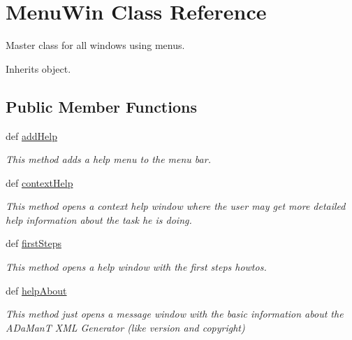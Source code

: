 \hypertarget{classgui_1_1window3_1_1MenuWin}{\section{Menu\-Win Class Reference}
\label{classgui_1_1window3_1_1MenuWin}
}


Master class for all windows using menus.  




Inherits object.

\subsection*{Public Member Functions}
\begin{DoxyCompactItemize}
\item 
def \hyperlink{classgui_1_1window3_1_1MenuWin_ab66f1da42371ac6f08a9817adf59a38e}{add\-Help}
\begin{DoxyCompactList}\small\item\em This method adds a help menu to the menu bar. \end{DoxyCompactList}\item 
def \hyperlink{classgui_1_1window3_1_1MenuWin_a4b810e6adc7d147eaa8edb45dd5891ca}{context\-Help}
\begin{DoxyCompactList}\small\item\em This method opens a context help window where the user may get more detailed help information about the task he is doing. \end{DoxyCompactList}\item 
def \hyperlink{classgui_1_1window3_1_1MenuWin_a2e91f76cce6e9b7a03830202f45aecf0}{first\-Steps}
\begin{DoxyCompactList}\small\item\em This method opens a help window with the first steps howtos. \end{DoxyCompactList}\item 
\hypertarget{classgui_1_1window3_1_1MenuWin_ad4f4bbba4c4a628d0a35195b093d6049}{def \hyperlink{classgui_1_1window3_1_1MenuWin_ad4f4bbba4c4a628d0a35195b093d6049}{help\-About}}\label{classgui_1_1window3_1_1MenuWin_ad4f4bbba4c4a628d0a35195b093d6049}

\begin{DoxyCompactList}\small\item\em This method just opens a message window with the basic information about the A\-Da\-Man\-T X\-M\-L Generator (like version and copyright) \end{DoxyCompactList}\end{DoxyCompactItemize}


